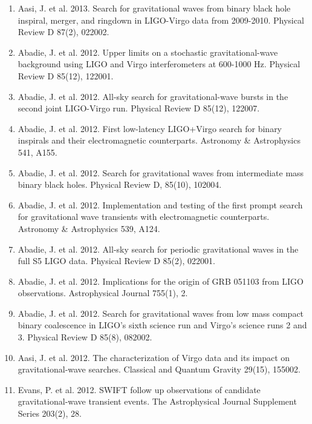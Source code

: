 \documentclass[margin,line]{res}
\begin{document}
\begin{resume}
\begin{enumerate}
\item Aasi, J. et al. 2013. Search for gravitational waves from binary black hole inspiral, merger, and ringdown in LIGO-Virgo data from 2009-2010. Physical Review D  87(2), 022002. 

\item Abadie, J. et al. 2012. Upper limits on a stochastic gravitational-wave background using LIGO and Virgo interferometers at 600-1000 Hz. Physical Review D  85(12), 122001. 

\item Abadie, J. et al. 2012. All-sky search for gravitational-wave bursts in the second joint LIGO-Virgo run. Physical Review D 85(12), 122007. 

\item Abadie, J. et al. 2012. First low-latency LIGO+Virgo search for binary inspirals and their electromagnetic counterparts. Astronomy \& Astrophysics 541, A155. 

\item Abadie, J. et al. 2012. Search for gravitational waves from intermediate mass binary black holes. Physical Review D, 85(10), 102004. 

\item Abadie, J. et al. 2012. Implementation and testing of the first prompt search for gravitational wave transients with electromagnetic counterparts. Astronomy \& Astrophysics 539, A124.

\item Abadie, J. et al. 2012. All-sky search for periodic gravitational waves in the full S5 LIGO data. Physical Review D 85(2), 022001.

\item Abadie, J. et al. 2012. Implications for the origin of GRB 051103 from LIGO observations. Astrophysical Journal 755(1), 2. 

\item Abadie, J. et al. 2012. Search for gravitational waves from low mass compact binary coalescence in LIGO's sixth science run and Virgo's science runs 2 and 3. Physical Review D 85(8), 082002.

\item Aasi, J. et al. 2012. The characterization of Virgo data and its impact on gravitational-wave searches. Classical and Quantum Gravity 29(15), 155002.

\item Evans, P. et al. 2012. SWIFT follow up observations of candidate gravitational-wave transient events. The Astrophysical Journal Supplement Series 203(2), 28. 


\end{enumerate}
\end{resume}
\end{document}
